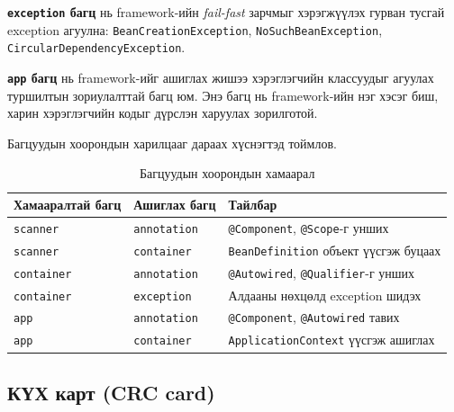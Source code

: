 \textbf{\texttt{exception} багц} нь framework-ийн
\textit{fail-fast} зарчмыг хэрэгжүүлэх гурван тусгай
exception агуулна: \texttt{BeanCreationException},
\texttt{NoSuchBeanException}, \texttt{CircularDependencyException}.

\textbf{\texttt{app} багц} нь framework-ийг ашиглах жишээ
хэрэглэгчийн классуудыг агуулах туршилтын зориулалттай багц
юм. Энэ багц нь framework-ийн нэг хэсэг биш, харин
хэрэглэгчийн кодыг дүрслэн харуулах зорилготой.

Багцуудын хоорондын харилцааг дараах хүснэгтэд тоймлов.

\begin{table}[H]
\centering
\caption{Багцуудын хоорондын хамаарал}
\label{tab:package-dependencies}
\renewcommand{\arraystretch}{1.3}
\begin{tabular}{|p{3.2cm}|p{3.2cm}|p{6.5cm}|}
\hline
\textbf{Хамааралтай багц} & \textbf{Ашиглах багц} & \textbf{Тайлбар} \\ \hline
\texttt{scanner}   & \texttt{annotation}  &
    \texttt{@Component}, \texttt{@Scope}-г унших \\ \hline
\texttt{scanner}   & \texttt{container}   &
    \texttt{BeanDefinition} объект үүсгэж буцаах \\ \hline
\texttt{container} & \texttt{annotation}  &
    \texttt{@Autowired}, \texttt{@Qualifier}-г унших \\ \hline
\texttt{container} & \texttt{exception}   &
    Алдааны нөхцөлд exception шидэх \\ \hline
\texttt{app}       & \texttt{annotation}  &
    \texttt{@Component}, \texttt{@Autowired} тавих \\ \hline
\texttt{app}       & \texttt{container}   &
    \texttt{ApplicationContext} үүсгэж ашиглах \\ \hline
\end{tabular}
\end{table}
\subsection{КҮХ карт (CRC card)}

